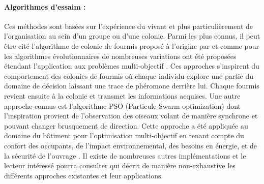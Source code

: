 \paragraph{Algorithmes d’essaim :} %
\label{par:algorithmes_d_essaim}
Ces méthodes sont basées sur l’expérience du vivant et plus particulièrement de
l’organisation au sein d’un groupe ou d’une colonie. Parmi les plus connus, il peut être
cité l’algorithme de colonie de fourmis proposé à l’origine par \cite{Colorni1992509}
et comme pour les algorithmes évolutionnaires de nombreuses variations ont été proposées
étendant l’application aux problèmes multi-objectif \parencite{MichaelGuntsch2003,Shea2006627}.
Ces approches s’inspirent du comportement des colonies de fourmis où chaque individu
explore une partie du domaine de décision laissant une trace de phéromone derrière lui.
Chaque fourmis revient ensuite à la colonie et transmet les informations acquises.
Une autre approche connus est l’algorithme PSO (Particule Swarm optimization) dont
l’inspiration provient de l’observation des oiseaux volant de manière synchrone et
pouvant changer brusquement de direction. Cette approche a été appliquée au domaine
du bâtiment pour l’optimisation multi-objectif en tenant compte du confort des occupants,
de l’impact environnemental, des besoins en énergie, et de la sécurité de l’ouvrage \parencite{Armand-Decker2015}.
Il existe de nombreuses autres implémentations et le lecteur intéressé pourra consulter
\cite{Aboul-EllaHassanien2015} qui décrit de manière non-exhaustive les différents
approches existantes et leur applications.

